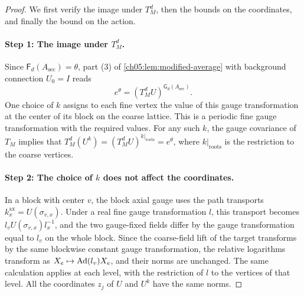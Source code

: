 \begin{proof}
We first verify the image under $T_M^d$, then the bounds on the coordinates, and finally the bound on the action.

\paragraph{Step 1: The image under $T_M^d$.}
Since $\mathsf F_d(A_{\mathrm{sec}})=\theta$, part (3) of \cref{ch05:lem:modified-average} with background connection $U_0=I$ reads
\[
 e^\theta=(T_M^dU)^{\mathsf G_d(A_{\mathrm{sec}})}.
\]
One choice of $k$ assigns to each fine vertex the value of this gauge transformation at the center of its block on the coarse lattice. This is a periodic fine gauge transformation with the required values. For any such $k$, the gauge covariance of $T_M$ implies that $T_M^d(U^k)=(T_M^dU)^{k|_{\mathrm{roots}}}=e^\theta$, where $k|_{\mathrm{roots}}$ is the restriction to the coarse vertices.

\paragraph{Step 2: The choice of $k$ does not affect the coordinates.}
In a block with center $v$, the block axial gauge uses the path transports $k^{\mathrm{ax}}_x=U(\sigma_{v,x})$. Under a real fine gauge transformation $l$, this transport becomes $l_vU(\sigma_{v,x})l_x^{-1}$, and the two gauge-fixed fields differ by the gauge transformation equal to $l_v$ on the whole block. Since the coarse-field lift of the target transforms by the same blockwise constant gauge transformation, the relative logarithms transform as $X_e\mapsto\operatorname{Ad}(l_v)X_e$, and their norms are unchanged. The same calculation applies at each level, with the restriction of $l$ to the vertices of that level. All the coordinates $z_j$ of $U$ and $U^k$ have the same norms.


\end{proof}
